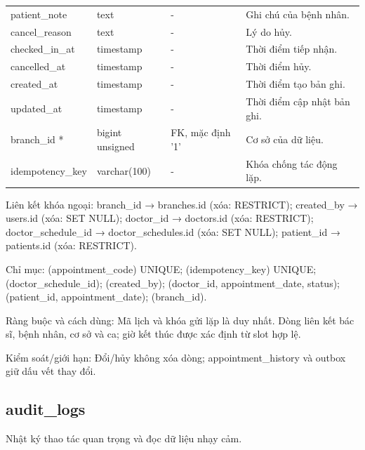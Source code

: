 {\begin{longtable}{@{}L{\textwidth-4.86pt\relax} L{\textwidth-3.96pt\relax} L{\textwidth-2.88pt\relax} L{\textwidth-6.3pt\relax}@{}}
patient\_\allowbreak{}note & text & - & Ghi chú của bệnh nhân.\allowbreak{}\\[1pt]
cancel\_\allowbreak{}reason & text & - & Lý do hủy.\allowbreak{}\\[1pt]
checked\_\allowbreak{}in\_\allowbreak{}at & timestamp & - & Thời điểm tiếp nhận.\allowbreak{}\\[1pt]
cancelled\_\allowbreak{}at & timestamp & - & Thời điểm hủy.\allowbreak{}\\[1pt]
created\_\allowbreak{}at & timestamp & - & Thời điểm tạo bản ghi.\allowbreak{}\\[1pt]
updated\_\allowbreak{}at & timestamp & - & Thời điểm cập nhật bản ghi.\allowbreak{}\\[1pt]
branch\_\allowbreak{}id * & bigint unsigned & FK, mặc định '1' & Cơ sở của dữ liệu.\allowbreak{}\\[1pt]
idempotency\_\allowbreak{}key & varchar(100) & - & Khóa chống tác động lặp.\allowbreak{}\\[1pt]
\end{longtable}}
Liên kết khóa ngoại:\allowbreak{} branch\_\allowbreak{}id → branches.\allowbreak{}id (xóa:\allowbreak{} RESTRICT); created\_\allowbreak{}by → users.\allowbreak{}id (xóa:\allowbreak{} SET NULL); doctor\_\allowbreak{}id → doctors.\allowbreak{}id (xóa:\allowbreak{} RESTRICT); doctor\_\allowbreak{}schedule\_\allowbreak{}id → doctor\_\allowbreak{}schedules.\allowbreak{}id (xóa:\allowbreak{} SET NULL); patient\_\allowbreak{}id → patients.\allowbreak{}id (xóa:\allowbreak{} RESTRICT).\allowbreak{}

Chỉ mục:\allowbreak{} (appointment\_\allowbreak{}code) UNIQUE; (idempotency\_\allowbreak{}key) UNIQUE; (doctor\_\allowbreak{}schedule\_\allowbreak{}id); (created\_\allowbreak{}by); (doctor\_\allowbreak{}id, appointment\_\allowbreak{}date, status); (patient\_\allowbreak{}id, appointment\_\allowbreak{}date); (branch\_\allowbreak{}id).\allowbreak{}

Ràng buộc và cách dùng:\allowbreak{} Mã lịch và khóa gửi lặp là duy nhất.\allowbreak{} Dòng liên kết bác sĩ, bệnh nhân, cơ sở và ca; giờ kết thúc được xác định từ slot hợp lệ.\allowbreak{}

Kiểm soát/\allowbreak{}giới hạn:\allowbreak{} Đổi/\allowbreak{}hủy không xóa dòng; appointment\_\allowbreak{}history và outbox giữ dấu vết thay đổi.\allowbreak{}

\clearpage

\subsection{audit\_\allowbreak{}logs}
Nhật ký thao tác quan trọng và đọc dữ liệu nhạy cảm.\allowbreak{}


